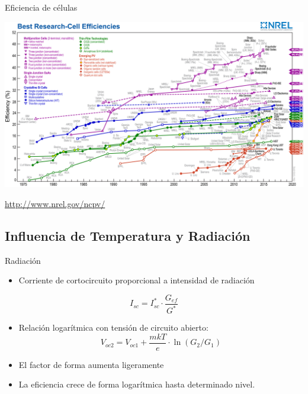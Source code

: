 \documentclass[xcolor={usenames,svgnames,dvipsnames}]{beamer}
\begin{document}
\begin{frame}[plain,label={sec:org87df558}]{Eficiencia de células}
\begin{center}
\includegraphics[width=1.2\textwidth]{../figs/efficiency_chart_nrel.jpg}
\end{center}

\url{http://www.nrel.gov/ncpv/}
\end{frame}

\subsection{Influencia de Temperatura y Radiación}
\label{sec:org9d5257f}

\begin{frame}[label={sec:orga5ca408}]{Radiación}
\begin{itemize}
\item \alert{Corriente de cortocircuito proporcional a intensidad de radiación}
\end{itemize}

\[
\boxed{I_{sc} = I^*_{sc}\cdot\frac{G_{ef}}{G^{*}}}
\]

\begin{itemize}
\item Relación logarítmica con tensión de circuito abierto:
\[
V_{oc2}=V_{oc1}+\frac{mkT}{e}\cdot\ln(G_2/G_1)
\]
\item El factor de forma aumenta ligeramente

\item La eficiencia crece de forma logarítmica hasta determinado nivel.
\end{itemize}
\end{frame}
\end{document}
